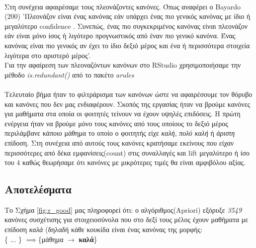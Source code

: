 \documentclass[12pt,a4paper,final]{article}
\begin{document}
\paragraph{}
Στη συνέχεια αφαιρέσαμε τους πλεονάζοντες κανόνες. Όπως αναφέρει ο \foreignlanguage{english}{Bayardo} (200) 'Πλεονάζον είναι ένας κανόνας εάν υπάρχει ένας πιο γενικός κανόνας με ίδιο ή μεγαλύτερο \foreignlanguage{english}{confidence} . Συνεπώς, ένας πιο συγκεκριμένος κανόνας είναι πλεονάζον εάν είναι μόνο ίσος ή λιγότερο προγνωστικός  από έναν πιο γενικό κανόνα. Ένας κανόνας είναι πιο γενικός αν έχει το ίδιο δεξιό μέρος και ένα ή περισσότερα στοιχεία λιγότερα στο αριστερό μέρος'. \\
 Για την αφαίρεση των πλεοναζόντων κανόνων στο \foreignlanguage{english}{RStudio} χρησιμοποιήσαμε την μέθοδο \foreignlanguage{english}{\emph{is.redundant()}} από το πακέτο \foreignlanguage{english}{\textit{arules}}
\paragraph{}
Τελευταίο βήμα ήταν το φιλτράρισμα  των κανόνων ώστε να αφαιρέσουμε  τον θόρυβο  και κανόνες που δεν μας ενδιαφέρουν. Σκοπός της εργασίας ήταν να βρούμε κανόνες για μαθήματα στα οποία οι φοιτητές τείνουν να έχουν υψηλές επιδόσεις. Η πρώτη ενέργεια ήταν να βρούμε μόνο τους κανόνες από τους οποίους το δεξιό μέρος περιλάμβανε κάποιο μάθημα το οποίο ο φοιτητής είχε \textit{καλή}, \textit{πολύ καλή} ή \textit{άριστη} επίδοση. Στη συνέχεια από αυτούς τους κανόνες  κρατήσαμε εκείνους που είχαν  περισσότερες  από δέκα εμφανίσεις(\foreignlanguage{english}{count}) στις συναλλαγές και \foreignlanguage{english}{lift} μεγαλύτερο ή ίσο του $4$ καθώς θεωρήσαμε ότι κανόνες με μικρότερες τιμές θα είναι αμφιβόλου αξίας.

\subsection{Αποτελέσματα}


Το Σχήμα \ref{fig:r_good} μας πληροφορεί ότι: ο αλγόριθμος(\foreignlanguage{english}{Apriori}) εξόρυξε \textit{3549} κανόνες συσχέτισης για στοιχειοσύνολα που στο δεξί τους μέλος έχουν μαθήματα με επίδοση \textit{καλά} (δηλαδή κάθε κουκίδα είναι ένας κανόνας της μορφής: \\

\{ ... \} $\implies$\{μάθημα $\to$ \textbf{καλά}\} \\
\end{document}
